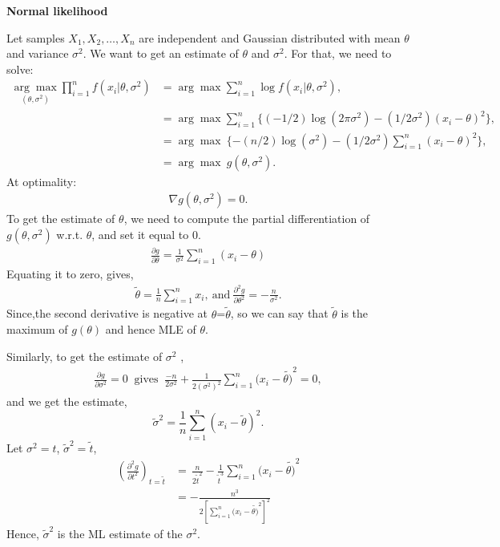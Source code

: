 \documentclass[a4paper,english,12pt]{article}
\begin{document}
\begin{exmp}\textbf{Normal likelihood}
\par Let samples $X_1,X_2,\dots,X_n$ are independent and Gaussian distributed with mean $\theta$ and variance $\sigma^2$. We want to get an estimate of $\theta$ and $\sigma^2$. For that, we need to solve:
\begin{align}
\underset{(\theta,\sigma^2)}{\arg\max}
\prod\limits_{i=1}^n f(x_i|\theta,\sigma^2)&= \arg\max\sum\limits_{i=1}^n \log f(x_i|\theta,\sigma^2),\\
&=\arg\max \sum\limits_{i=1}^n\{(-1/2)\log(2\pi\sigma^2)-(1/2\sigma^2)(x_i-\theta)^2\},\nonumber\\
&=\arg\max~\{-(n/2)\log(\sigma^2)-(1/2\sigma^2)\sum\limits_{i=1}^n(x_i-\theta)^2\},\nonumber\\
&=\arg\max~g(\theta,\sigma^2).
\end{align}
At optimality: 
\begin{align}
\nabla{g}(\theta,\sigma^2)=0.
\end{align} 
To get the estimate of $\theta$, we need to compute the partial differentiation of ${g}(\theta,\sigma^2)$ w.r.t. $\theta$, and set it equal to $0$. 
\begin{align}
\frac{\partial g}{\partial \theta}=\frac{1}{\sigma^2}\sum\limits_{i=1}^n(x_i-\theta)
\end{align}
Equating it to zero, gives,
\begin{align}
\tilde{\theta}=\frac{1}{n}\sum\limits_{i=1}^n x_i,~\mbox{and}~
\frac{\partial^2 g}{\partial \theta^2}=-\frac{n}{\sigma^2}.
\end{align}
Since,the second derivative is negative at $\theta$=$\tilde{\theta}$, so we can say that
 $\tilde{\theta}$ is the maximum of $g(\theta)$ and hence MLE of $\theta$.
\par Similarly, to get the estimate of $\sigma^2$ ,
\begin{align}
\frac{\partial g}{\partial \sigma^2}=0~\mbox{ gives }~\frac{-n}{2\sigma^2}+\frac{1}{2(\sigma^2)^2}\sum\limits_{i=1}^n(x_i-\tilde{\theta)}^2=0,
\end{align}
and we get the estimate,
\begin{equation}
\tilde{\sigma}^2=\frac{1}{n}\sum\limits_{i=1}^n(x_i-\tilde{\theta})^2.
\end{equation}
Let $\sigma^2=t$, $\tilde{\sigma}^2=\tilde{t}$,
\begin{align}
{\left(\frac{\partial^2 g}{\partial t^2}\right)}_{t=\tilde{t}}&=\, \frac{n}{2\tilde{t}^2}-\frac{1}{\tilde{t}^3}\sum\limits_{i=1}^n(x_i-\tilde{\theta)}^2\\
&=-\frac{n^3}{2\left[\sum\limits_{i=1}^n(x_i-\tilde{\theta)}^2\right]^2}
\end{align}
Hence, $\tilde{\sigma}^2$ is the ML estimate of the $\sigma^2$.
\end{exmp}
\end{document}
